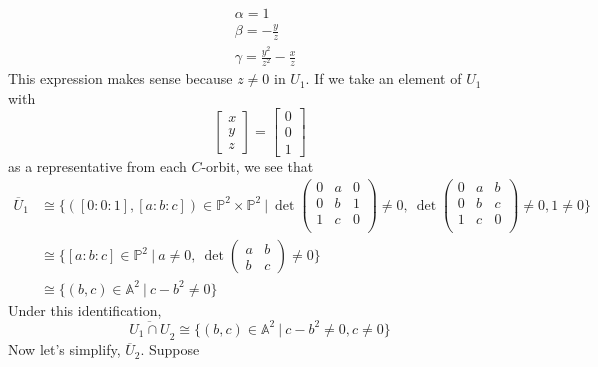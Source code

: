 \begin{example}
	\begin{align*}
		&\alpha=1\\
		&\beta=-\frac{y}{z}\\
		&\gamma=\frac{y^2}{z^2}-\frac{x}{z}
	\end{align*}
This expression makes sense because $z\neq 0$ in $U_1$.
If we take an element of $U_1$ with 
\[
	\begin{bmatrix}
		x\\
		y\\
		z
	\end{bmatrix}
	=
	\begin{bmatrix}
		0\\
		0\\
		1
	\end{bmatrix}	
\]
as a representative from each $C$-orbit, we see that 
\begin{align*}
	\overline{U}_1
	&\cong
	\{
	([0:0:1],[a:b:c])\in \mathbb{P}^2 \times \mathbb{P}^2~|~
	\operatorname{det}
	\begin{pmatrix}
	0&a&0\\
	0&b&1\\
	1&c&0\\
	\end{pmatrix}
	\neq 0,~
	\operatorname{det}
	\begin{pmatrix}
	0&a&b\\
	0&b&c\\
	1&c&0\\
	\end{pmatrix}
	\neq 0,
	1\neq 0	 	
	\}\\
	&\cong
	\{
	[a:b:c]\in \mathbb{P}^2~|~
	a\neq 0,~
	\operatorname{det}
	\begin{pmatrix}
	a&b\\
	b&c
	\end{pmatrix}
	\neq 0	 	
	\}\\
	&\cong
	\{
	(b,c)\in \mathbb{A}^2~|~
	c-b^2\neq 0 	
	\}	
\end{align*}
Under this identification,
\[
	\overline{U_1\cap U}_2
	\cong
	\{
	(b,c)\in \mathbb{A}^2~|~
	c-b^2\neq 0,c\neq 0 	
	\}
\]
Now let's simplify, $ \overline{U}_2 $. Suppose


\end{example}
